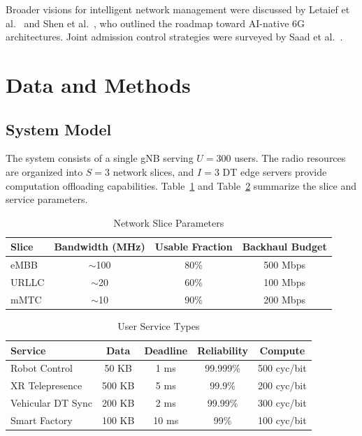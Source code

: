 \documentclass[12pt]{article}
\begin{document}
Broader visions for intelligent network management were discussed by Letaief et al.\ \cite{letaief2019roadmap} and Shen et al.\ \cite{shen2022holistic}, who outlined the roadmap toward AI-native 6G architectures. Joint admission control strategies were surveyed by Saad et al.\ \cite{saad2015joint}.

\newpage

\section{Data and Methods}

\subsection{System Model}

The system consists of a single gNB serving $U = 300$ users. The radio resources are organized into $S = 3$ network slices, and $I = 3$ DT edge servers provide computation offloading capabilities. Table~\ref{tab:slices} and Table~\ref{tab:services} summarize the slice and service parameters.

\begin{table}[H]
\centering
\caption{Network Slice Parameters}
\label{tab:slices}
\begin{tabular}{lccc}
\toprule
\textbf{Slice} & \textbf{Bandwidth (MHz)} & \textbf{Usable Fraction} & \textbf{Backhaul Budget} \\
\midrule
eMBB  & $\sim$100 & 80\% & 500 Mbps \\
URLLC & $\sim$20  & 60\% & 100 Mbps \\
mMTC  & $\sim$10  & 90\% & 200 Mbps \\
\bottomrule
\end{tabular}
\end{table}

\begin{table}[H]
\centering
\caption{User Service Types}
\label{tab:services}
\begin{tabular}{lcccc}
\toprule
\textbf{Service} & \textbf{Data} & \textbf{Deadline} & \textbf{Reliability} & \textbf{Compute} \\
\midrule
Robot Control      & 50 KB  & 1 ms  & 99.999\% & 500 cyc/bit \\
XR Telepresence    & 500 KB & 5 ms  & 99.9\%   & 200 cyc/bit \\
Vehicular DT Sync  & 200 KB & 2 ms  & 99.99\%  & 300 cyc/bit \\
Smart Factory      & 100 KB & 10 ms & 99\%     & 100 cyc/bit \\
\bottomrule
\end{tabular}
\end{table}
\end{document}
